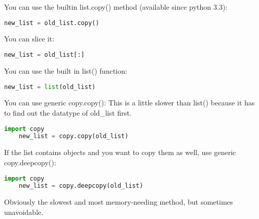 \documentclass[a4paper,12pt,twoside]{book}
\begin{document}
You can use the builtin list.copy() method (available since python 3.3):
\begin{lstlisting}[frame=single, language=Python]
	new_list = old_list.copy()
\end{lstlisting}  
You can slice it:
\begin{lstlisting}[frame=single, language=Python]
	new_list = old_list[:]
\end{lstlisting}  
You can use the built in list() function:
\begin{lstlisting}[frame=single, language=Python]
	new_list = list(old_list)
\end{lstlisting}  
You can use generic copy.copy(): This is a little slower than list() because it has to find out the datatype of old\_list first.


\begin{lstlisting}[frame=single, language=Python]
	import copy
	new_list = copy.copy(old_list)
\end{lstlisting}  


If the list contains objects and you want to copy them as well, use generic copy.deepcopy():

\begin{lstlisting}[frame=single, language=Python]
	import copy
	new_list = copy.deepcopy(old_list)
\end{lstlisting}
Obviously the slowest and most memory-needing method, but sometimes unavoidable.
\end{document}
